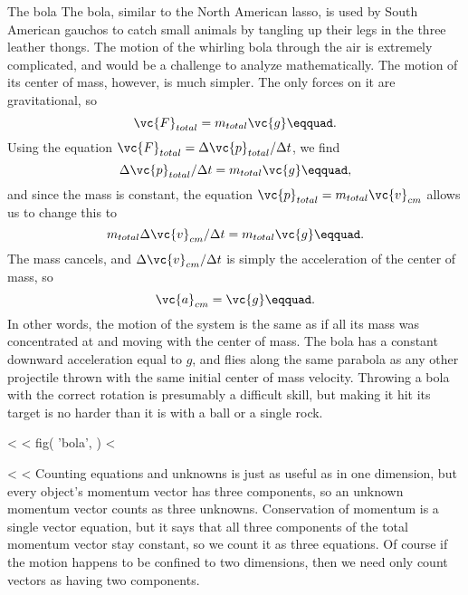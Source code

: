 \begin{eg}{The bola}\label{eg:bola}
The bola, similar to the North American lasso, is used by
South American gauchos to catch small animals by tangling up
their legs in the three leather thongs. The motion of the
whirling bola through the air is extremely complicated, and
would be a challenge to analyze mathematically. The motion
of its center of mass, however, is much simpler. The only
forces on it are gravitational, so
\begin{equation*}
                \vc{F}_{total} =  m_{total}\vc{g}\eqquad.
\end{equation*}
Using the equation $\vc{F}_{total}  =  \Delta\vc{p}_{total}/\Delta t$, we find
\begin{equation*}
                \Delta \vc{p}_{total}/\Delta t   =  m_{total}\vc{g}\eqquad,
\end{equation*}
and since the mass is constant, the equation $\vc{p}_{total}=m_{total}\vc{v}_{cm}$
allows us to change this to
\begin{equation*}
                m_{total}\Delta \vc{v}_{cm}/\Delta t  =  m_{total}\vc{g}\eqquad.
\end{equation*}
The mass cancels, and $\Delta \vc{v}_{cm}/\Delta t$ is simply
the acceleration of the center of mass, so
\begin{equation*}
                \vc{a}_{cm}  =  \vc{g}\eqquad.
\end{equation*}
In other words, the motion of the system is the same as if
all its mass was concentrated at and moving with the center
of mass. The bola has a constant downward acceleration equal
to $g$, and flies along the same parabola as any other
projectile thrown with the same initial center of mass
velocity. Throwing a bola with the correct rotation is
presumably a difficult skill, but making it hit its target
is no harder than it is with a ball or a single rock.

\end{eg}

<%
<%
  fig(
    'bola',
  )
<%

<%
<%
Counting equations and unknowns is just as useful as in one
dimension, but every object's momentum vector has three
components, so an unknown momentum vector counts as three
unknowns. Conservation of momentum is a single vector
equation, but it says that all three components of the total
momentum vector stay constant, so we count it as three
equations. Of course if the motion happens to be confined to
two dimensions, then we need only count vectors as
having two components.

